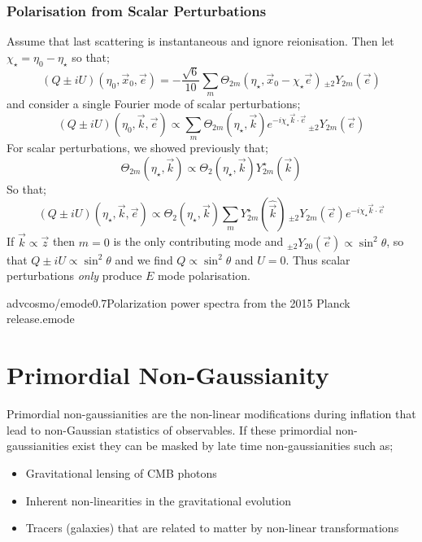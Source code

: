 \subsubsection{Polarisation from Scalar Perturbations}
Assume that last scattering is instantaneous and ignore reionisation. Then let $\chi_\star = \eta_0 - \eta_\star$ so that;
\begin{equation*}
\left(Q \pm i U\right)(\eta_0, \vec{x}_0, \vec{e}) = -\frac{\sqrt{6}}{10}\sum_{m}{\Theta_{2m}(\eta_\star,\vec{x}_0 - \chi_\star \vec{e}) \, _{\pm2}Y_{2m}(\vec{e})}
\end{equation*}
and consider a single Fourier mode of scalar perturbations;
\begin{equation*}
(Q \pm iU)(\eta_0, \vec{k}, \vec{e}) \propto \sum_{m}{\Theta_{2m}(\eta_\star, \vec{k})e^{-i\chi_\star \vec{k}\cdot\vec{e}}\, _{\pm2}Y_{2m}(\vec{e})}
\end{equation*}
For scalar perturbations, we showed previously that;
\begin{equation*}
\Theta_{2m}(\eta_\star, \vec{k}) \propto \Theta_2(\eta_\star, \vec{k})Y^{\star}_{2m}(\vec{k})
\end{equation*}
So that;
\begin{equation*}
(Q \pm i U)(\eta_\star, \vec{k}, \vec{e}) \propto \Theta_2(\eta_\star, \vec{k}) \sum_{m}{Y^{\star}_{2m}(\hat{\vec{k}})\, _{\pm2}Y_{2m}(\vec{e})} e^{-i\chi_\star \vec{k}\cdot \vec{e}}
\end{equation*}
If $\vec{k} \propto \vec{z}$ then $m = 0$ is the only contributing mode and $_{\pm2}Y_{20}(\vec{e}) \propto \sin^2 \theta$, so that $Q \pm i U \propto \sin^2 \theta$ and we find $Q \propto \sin^2 \theta$ and $U = 0$. Thus scalar perturbations \emph{only} produce $E$ mode polarisation. 
\begin{mygraphic}{advcosmo/emode}{0.7}{Polarization power spectra from the 2015 Planck release.}{emode}\end{mygraphic}
\newpage
\section{Primordial Non-Gaussianity}
Primordial non-gaussianities are the non-linear modifications during inflation that lead to non-Gaussian statistics of observables. If these primordial non-gaussianities exist they can be masked by late time non-gaussianities such as;
\begin{itemize}
\item Gravitational lensing of CMB photons
\item Inherent non-linearities in the gravitational evolution
\item Tracers (galaxies) that are related to matter by non-linear transformations
\end{itemize}
